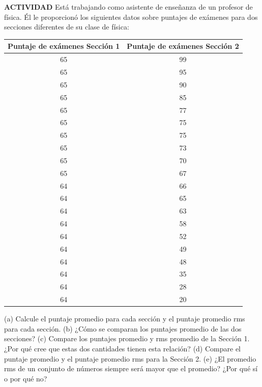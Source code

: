 \item \textbf{ACTIVIDAD} Está trabajando como asistente de enseñanza de un profesor de física. Él le proporcionó los siguientes datos sobre puntajes de exámenes para dos secciones diferentes de su clase de física:

\begin{center}
\begin{tabular}{|c|c|}
\hline
\textbf{Puntaje de exámenes Sección 1} & \textbf{Puntaje de exámenes Sección 2} \\ \hline
65 & 99 \\
65 & 95 \\
65 & 90 \\
65 & 85 \\
65 & 77 \\
65 & 75 \\
65 & 75 \\
65 & 73 \\
65 & 70 \\
65 & 67 \\
64 & 66 \\
64 & 65 \\
64 & 63 \\
64 & 58 \\
64 & 52 \\
64 & 49 \\
64 & 48 \\
64 & 35 \\
64 & 28 \\
64 & 20 \\ \hline
\end{tabular}
\end{center}

(a) Calcule el puntaje promedio para cada sección y el puntaje promedio rms para cada sección. (b) ¿Cómo se comparan los puntajes promedio de las dos secciones? (c) Compare los puntajes promedio y rms promedio de la Sección 1. ¿Por qué cree que estas dos cantidades tienen esta relación? (d) Compare el puntaje promedio y el puntaje promedio rms para la Sección 2. (e) ¿El promedio rms de un conjunto de números siempre será mayor que el promedio? ¿Por qué sí o por qué no?
